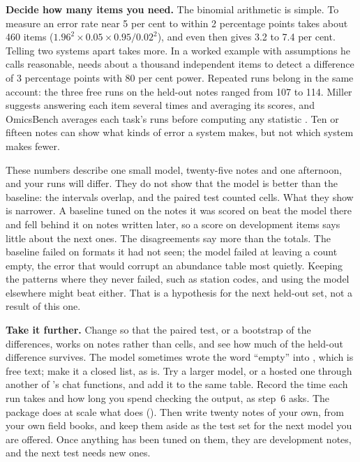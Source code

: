 \textbf{Decide how many items you need.} The binomial arithmetic is simple. To
measure an error rate near 5 per cent to within 2 percentage points takes about
460 items ($1.96^2 \times 0.05 \times 0.95 / 0.02^2$), and even then
 gives 3.2 to 7.4 per cent. Telling two systems apart
takes more. In a worked example with assumptions he calls reasonable,
\textcite{miller2024errorbars} needs about a thousand independent items to
detect a difference of 3 percentage points with 80 per cent power. Repeated runs belong in the same
account: the three free runs on the held-out notes ranged from 107 to 114.
Miller suggests answering each item several times and averaging its scores,
and OmicsBench averages each task's runs before computing any statistic
\parencite{shaked2026omicsbench}. Ten or fifteen notes can show what kinds of
error a system makes, but not which system makes fewer.

These numbers describe one small model, twenty-five notes and one afternoon,
and your runs will differ. They do not show that the model is better than the
baseline: the intervals overlap, and the paired test counted cells. What they
show is narrower. A baseline tuned on the notes it was scored on beat the model
there and fell behind it on notes written later, so a score on development
items says little about the next ones. The disagreements say more than the
totals. The baseline failed on formats it had not seen; the model failed at
leaving a count empty, the error that would corrupt an abundance table most
quietly. Keeping the patterns where they never failed, such as station codes,
and using the model elsewhere might beat either. That is a hypothesis for the
next held-out set, not a result of this one.

\textbf{Take it further.} Change  so that the paired test, or
a bootstrap of the differences, works on notes rather than cells, and see how
much of the held-out difference survives. The model sometimes wrote the word
``empty'' into , which is free text; make it a closed list,
as  is. Try a larger model, or a hosted one through another of
's chat functions, and add it to the same table. Record the time
each run takes and how long you spend checking the output, as step~6 asks. The
 package does at scale what  does
(). Then write twenty notes of your own, from your own
field books, and keep them aside as the test set for the next model you are
offered. Once anything has been tuned on them, they are development notes, and
the next test needs new ones.

